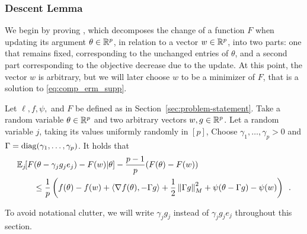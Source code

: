 \subsubsection{Descent Lemma}


We begin by proving , which decomposes the
change of a function $F$ when updating its argument $\theta \in \mathbb R^p$,
in relation to a vector $w \in \mathbb R^p$, into two parts:
one that remains fixed, corresponding to the unchanged entries of $\theta$,
and a second part corresponding to the objective decrease due to the
update.
At this point, the vector $w$ is arbitrary, but we will later choose $w$ to be
a minimizer of $F$, that is a solution to \eqref{eq:comp_erm_supp}.
\begin{lemma}
  \label{lemma:expec-first-upper-bound}
  Let $\ell, f, \psi,$ and $F$ be defined as in
  Section~\ref{sec:problem-statement}.
  Take a random variable $\theta \in \mathbb R^p$ and two arbitrary vectors
  $w, g \in \mathbb R^p$.
  Let a random variable $j$, taking its values uniformly randomly in $[p]$,
  Choose $\gamma_1, \dots, \gamma_p > 0$ and $\Gamma = \operatorname{diag}(\gamma_1, \dots, \gamma_p)$.
  It holds that%
  \begin{align}
    \label{eq:lemma-1-eq}
     & \mathbb E_{j} \hspace{-0.29em} \left[ F(\theta - \gamma_j g_j e_j) - F(w) \middle\vert \theta \right] - \frac{p - 1}{p} (F(\theta) - F(w)) \nonumber \\
     & \qquad \le \frac{1}{p} \left(f(\theta) - f(w) + \left\langle \nabla f(\theta), - \Gamma g \right\rangle
    + \frac{1}{2}\left \lVert \Gamma g \right \rVert_{M}^2 + \psi(\theta - \Gamma g) - \psi
    (w)\right)\enspace.
  \end{align}
\end{lemma}
\begin{remark}
  \label{rmq:expec-first-upper-bound-without-non-smooth}
  To avoid notational clutter, we will write $\gamma_j g_j$ instead of
  $\gamma_j g_j e_j$ throughout this section.
\end{remark}
